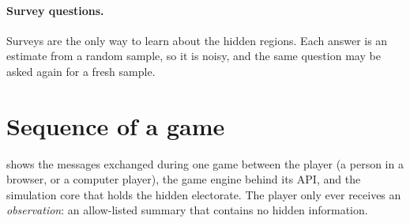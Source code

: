 \documentclass[11pt,a4paper,oneside]{report}
\begin{document}
\paragraph{Survey questions.} Surveys are the only way to learn about the hidden regions. Each answer is an
estimate from a random sample, so it is noisy, and the same question may be asked again for a fresh
sample.

\section{Sequence of a game}

 shows the messages exchanged during one game between the player (a person in a
browser, or a computer player), the game engine behind its API, and the simulation core that holds the
hidden electorate. The player only ever receives an \emph{observation}: an allow-listed summary that
contains no hidden information.
\end{document}
